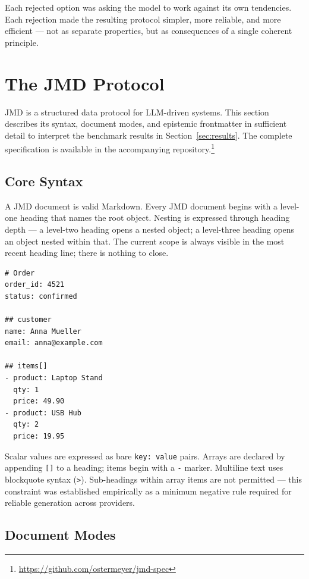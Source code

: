 \documentclass[11pt]{article}
\begin{document}
Each rejected option was asking the model to work against its own tendencies. Each rejection made the resulting protocol simpler, more reliable, and more efficient --- not as separate properties, but as consequences of a single coherent principle.

\section{The JMD Protocol}

JMD is a structured data protocol for LLM-driven systems. This section describes its syntax, document modes, and epistemic frontmatter in sufficient detail to interpret the benchmark results in Section~\ref{sec:results}. The complete specification is available in the accompanying repository.\footnote{\url{https://github.com/ostermeyer/jmd-spec}}

\subsection{Core Syntax}

A JMD document is valid Markdown. Every JMD document begins with a level-one heading that names the root object. Nesting is expressed through heading depth --- a level-two heading opens a nested object; a level-three heading opens an object nested within that. The current scope is always visible in the most recent heading line; there is nothing to close.

\begin{lstlisting}
# Order
order_id: 4521
status: confirmed

## customer
name: Anna Mueller
email: anna@example.com

## items[]
- product: Laptop Stand
  qty: 1
  price: 49.90
- product: USB Hub
  qty: 2
  price: 19.95
\end{lstlisting}

Scalar values are expressed as bare \texttt{key: value} pairs. Arrays are declared by appending \texttt{[]} to a heading; items begin with a \texttt{-} marker. Multiline text uses blockquote syntax (\texttt{>}). Sub-headings within array items are not permitted --- this constraint was established empirically as a minimum negative rule required for reliable generation across providers.

\subsection{Document Modes}
\end{document}
